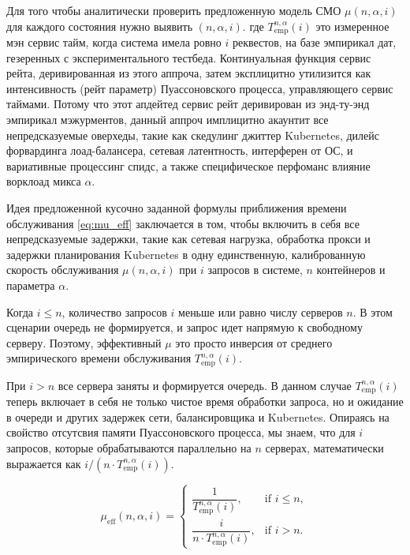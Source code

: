 \documentclass[12pt]{article}
\begin{document}
Для того чтобы аналитически проверить предложенную модель СМО $\mu(n, \alpha, i)$ для каждого состояния нужно выявить $(n, \alpha, i)$. где $T_{\text{emp}}^{n, \alpha}(i)$ это измеренное мэн сервис тайм, когда система имела ровно $i$ реквестов, на базе эмпирикал дат, гезеренных с экспериментального тестбеда. Континуальная функция сервис рейта, деривированная из этого аппроча, затем эксплицитно утилизится как интенсивность (рейт параметр) Пуассоновского процесса, управляющего сервис таймами. Потому что этот апдейтед сервис рейт деривирован из энд-ту-энд эмпирикал мэжурментов, данный аппроч имплицитно акаунтит все непредсказуемые оверхеды, такие как скедулинг джиттер Kubernetes, дилейс форвардинга лоад-балансера, сетевая латентность, интерферен от ОС, и вариативные процессинг спидс, а также специфическое перфоманс влияние ворклоад микса $\alpha$.

Идея предложенной кусочно заданной формулы приближения времени обслуживания \ref{eq:mu_eff} заключается в том, чтобы включить в себя все непредсказуемые задержки, такие как сетевая нагрузка, обработка прокси и задержки планирования Kubernetes в одну единственную, калиброванную скорость обслуживания $\mu(n, \alpha, i)$ при $i$ запросов в системе, $n$ контейнеров и параметра $\alpha$.

Когда $i \le n$, количество запросов $i$ меньше или равно числу серверов $n$. В этом сценарии очередь не формируется, и запрос идет напрямую к свободному серверу. Поэтому, эффективный $\mu$ это просто инверсия от среднего эмпирического времени обслуживания $T_{\mathrm{emp}}^{n, \alpha}(i)$.

При $i > n$ все сервера заняты и формируется очередь. В данном случае $T_{\mathrm{emp}}^{n, \alpha}(i)$ теперь включает в себя не только чистое время обработки запроса, но и ожидание в очереди и других задержек сети, балансировщика и Kubernetes.  Опираясь на свойство отсутсвия памяти Пуассоновского процесса, мы знаем, что для $i$ запросов, которые обрабатываются параллельно на $n$ серверах, математически выражается как $i / (n \cdot T_{\mathrm{emp}}^{n, \alpha}(i))$.

\begin{equation}
  \mu_{\mathrm{eff}}(n, \alpha, i) =
  \left\{
  \begin{array}{ll}
    \dfrac{1}{T_{\mathrm{emp}}^{n, \alpha}(i)},         & \text{if } i \le n, \\[12pt]
    \dfrac{i}{n \cdot T_{\mathrm{emp}}^{n, \alpha}(i)}, & \text{if } i > n.
  \end{array}
  \right.
  \label{eq:mu_eff}
\end{equation}
\end{document}
